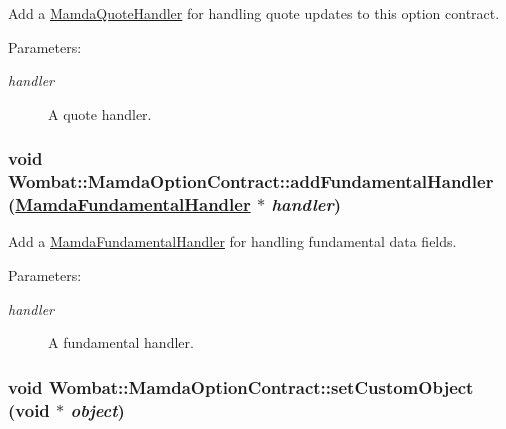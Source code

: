 Add a \hyperlink{classWombat_1_1MamdaQuoteHandler}{Mamda\-Quote\-Handler} for handling quote updates to this option contract. 

\begin{Desc}
\item[Parameters:]
\begin{description}
\item[{\em handler}]A quote handler. \end{description}
\end{Desc}
\hypertarget{classWombat_1_1MamdaOptionContract_f19a17c9139d85a3caa31d2f595ff3c7}{
\subsubsection[addFundamentalHandler]{\setlength{\rightskip}{0pt plus 5cm}void Wombat::Mamda\-Option\-Contract::add\-Fundamental\-Handler (\hyperlink{classWombat_1_1MamdaFundamentalHandler}{Mamda\-Fundamental\-Handler} $\ast$ {\em handler})}}
\label{classWombat_1_1MamdaOptionContract_f19a17c9139d85a3caa31d2f595ff3c7}


Add a \hyperlink{classWombat_1_1MamdaFundamentalHandler}{Mamda\-Fundamental\-Handler} for handling fundamental data fields. 

\begin{Desc}
\item[Parameters:]
\begin{description}
\item[{\em handler}]A fundamental handler. \end{description}
\end{Desc}
\hypertarget{classWombat_1_1MamdaOptionContract_302fbffec136a686aea50d41d31bbb33}{
\subsubsection[setCustomObject]{\setlength{\rightskip}{0pt plus 5cm}void Wombat::Mamda\-Option\-Contract::set\-Custom\-Object (void $\ast$ {\em object})}}
\label{classWombat_1_1MamdaOptionContract_302fbffec136a686aea50d41d31bbb33}



